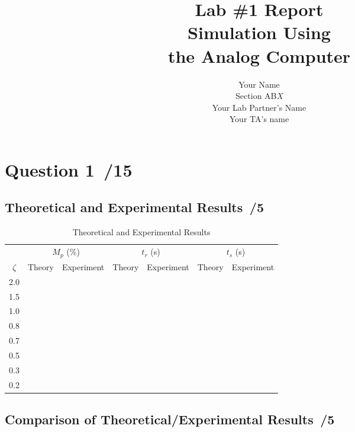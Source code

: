 \documentclass{article}
\newcommand{\score}{\hfill \underline{\hspace{0.65cm}}\,/} %
\begin{document}
%
\title{\bf Lab \#1 Report\\{\sc Simulation Using \\the Analog Computer}}
\author{Your Name\\ Section AB\emph{X}\\
  Your Lab Partner's Name\\
  Your TA's name}
\maketitle
\noindent {}
\section*{Question 1 \score 15}
\subsection*{Theoretical and Experimental Results \score 5}
\begin{table}[phtb]
  \begin{center}
    \caption{Theoretical and Experimental Results}
     \label{tbl:lab1_q1}
    \begin{tabular}{c|rr|rr|rr} \hline \hline
      & \multicolumn{2}{c}{$M_p$ (\%)} & \multicolumn{2}{c}{$t_r$ (s)} & \multicolumn{2}{c}{$t_s$ (s)} \\ \cline{2-7} %
      $\zeta$ & Theory & Experiment & Theory & Experiment & Theory & Experiment \\
      \hline
      2.0 & &&&&&\\ 
      1.5 & &&&&&\\
      1.0 & &&&&&\\
      0.8 & &&&&&\\
      0.7 & &&&&&\\
      0.5 & &&&&&\\
      0.3 & &&&&&\\
      0.2 & &&&&& \\ \hline 
    \end{tabular} 
    \end{center}
\end{table}
\subsection*{Comparison of Theoretical/Experimental Results \score 5}
\end{document}
